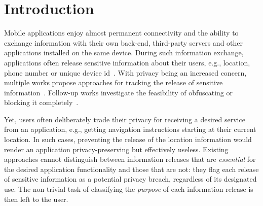 \section{Introduction}
\label{sec:intro} 
Mobile applications enjoy almost permanent connectivity and the ability to exchange information with their own back-end, third-party servers and other applications installed on the same device. 
During such information exchange, applications often release sensitive information about their users, e.g., location, phone number or unique device id~\cite{Enck:Gilbert:Chun:Cox:Jung:McDaniel:Sheth:OSDI10, Egele:Kruegel:Kirda:Vign:NDSS11,Tripp:Rubin:SEC14}. 
With privacy being an increased concern, multiple works propose approaches for tracking the release of 
sensitive information~\cite{Enck:Gilbert:Chun:Cox:Jung:McDaniel:Sheth:OSDI10,Egele:Kruegel:Kirda:Vign:NDSS11,Arzt:Rasthofer:Fritz:Bodden:Bartel:Klein:Traon:Octeau:McDaniel:PLDI14, Tripp:Rubin:SEC14,Gordon:Kim:Perkins:Gilham:Nguyen:Rinard:NDSS15}. Follow-up works investigate the
feasibility of obfuscating or blocking it completely~\cite{Hornyack:Han:Jung:Schechter:Wetherall:CCS11}.

Yet, users often deliberately trade their privacy for receiving a desired service from an application, 
e.g., getting navigation instructions starting at their current location. 
In such cases, preventing the release of the location information would render an application privacy-preserving but effectively useless.
Existing approaches cannot distinguish between information releases that are \emph{essential} for the desired application functionality and those that are not: 
they flag each release of sensitive information as a potential privacy breach, regardless of its designated use.
The non-trivial task of classifying the \emph{purpose} of each information release is then left to the user. 



